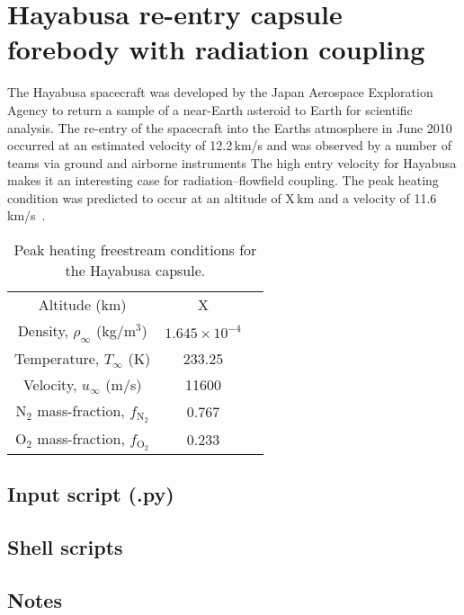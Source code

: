 
\section{Hayabusa re-entry capsule forebody with radiation coupling}
\label{sec:hayabusa}
%
The Hayabusa spacecraft was developed by the Japan Aerospace Exploration Agency to return a sample 
of a near-Earth asteroid to Earth for scientific analysis.
The re-entry of the spacecraft into the Earths atmosphere in June 2010 
occurred at an estimated velocity of 12.2\,km/s and 
was observed by a number of teams via ground and airborne instruments%
The high entry velocity for Hayabusa makes it an interesting case for radiation--flowfield coupling.
The peak heating condition was predicted to occur at an altitude of X\,km and 
a velocity of 11.6\,km/s~\cite{SFA2003}.

\begin{table}[h]
 \small
 \centering
 \caption{Peak heating freestream conditions for the Hayabusa capsule. }
 \label{tab:hayabusa_effective_flight}
 \begin{tabular*}{0.5\textwidth}{ccc}
  \hline Altitude (km)                                                            & X\\
             Density,  $\rho_\infty$ (kg/m$^3$)                      & $1.645 \times 10^{-4}$   \\
             Temperature, $T_\infty$ (K)                                 & 233.25         \\
             Velocity, $u_\infty$ (m/s)                                      & 11600  \\
             N$_2$ mass-fraction, $f_\text{N$_2$}$            & 0.767 \\
             O$_2$ mass-fraction, $f_\text{O$_2$}$            & 0.233 \\
  \hline
 \end{tabular*}
\end{table}

\newpage

\subsection{Input script (.py)}
\topbar

\bottombar

\subsection{Shell scripts}
\topbar

\bottombar

\subsection{Notes}
